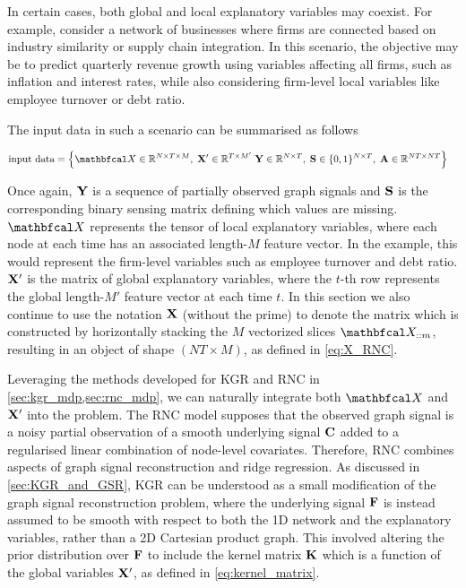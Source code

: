 In certain cases, both global and local explanatory variables may coexist. For example, consider a network of businesses where firms are connected based on industry similarity or supply chain integration. In this scenario, the objective may be to predict quarterly revenue growth using variables affecting all firms, such as inflation and interest rates, while also considering firm-level local variables like employee turnover or debt ratio.

The input data in such a scenario can be summarised as follows

\begin{align*}
    \text{input data} &= \left\{\Xt \in \R^{N \times T \times M}, \; \X' \in \R^{T \times M'} \; \Y \in \R^{N \times T}, \; \Ss \in \{0, 1\}^{N \times T}, \; \A \in \R^{NT \times NT} \right\}
\end{align*}

Once again, $\mathbf{Y}$ is a sequence of partially observed graph signals and $\mathbf{S}$ is the corresponding binary sensing matrix  defining which values are missing. $\Xt$ represents the tensor of local explanatory variables, where each node at each time has an associated length-$M$ feature vector. In the example, this would represent the firm-level variables such as employee turnover and debt ratio. $\mathbf{X}'$ is the matrix of global explanatory variables, where the $t$-th row represents the global length-$M'$ feature vector at each time $t$. In this section we also continue to use the notation $\mathbf{X}$ (without the prime) to denote the matrix which is constructed by horizontally stacking the $M$ vectorized slices $\Xt_{::m}$, resulting in an object of shape $(NT \times M)$, as defined in \cref{eq:X_RNC}. 

Leveraging the methods developed for KGR and RNC in \cref{sec:kgr_mdp,sec:rnc_mdp}, we can naturally integrate both $\Xt$ and $\mathbf{X}'$ into the problem. The RNC model supposes that the observed graph signal is a noisy partial observation of a smooth underlying signal $\mathbf{C}$ added to a regularised linear combination of node-level covariates. Therefore, RNC combines aspects of graph signal reconstruction and ridge regression. As discussed in \cref{sec:KGR_and_GSR}, KGR can be understood as a small modification of the graph signal reconstruction problem, where the underlying signal $\mathbf{F}$ is instead assumed to be smooth with respect to both the 1D network and the explanatory variables, rather than a 2D Cartesian product graph. This involved altering the prior distribution over $\mathbf{F}$ to include the kernel matrix $\mathbf{K}$ which is a function of the global variables $\mathbf{X}'$, as defined in \cref{eq:kernel_matrix}. 

